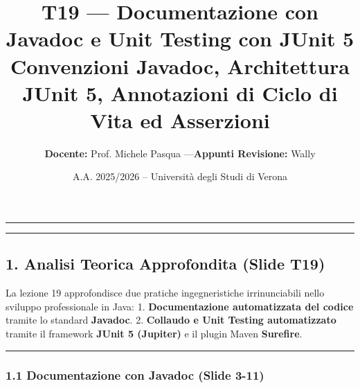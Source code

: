 \documentclass[11pt,a4paper]{article}
\title{\Huge\bfseries\sffamily\color{brandblue} T19 --- Documentazione con Javadoc e Unit Testing con JUnit 5 \\[0.3em] \large\sffamily Convenzioni Javadoc, Architettura JUnit 5, Annotazioni di Ciclo di Vita ed Asserzioni}
\author{\textbf{Docente:} Prof. Michele Pasqua \quad---\quad \textbf{Appunti Revisione:} Wally}
\date{A.A. 2025/2026 -- Universit\`a degli Studi di Verona}
\begin{document}
\maketitle
\thispagestyle{fancy}
\vspace{-1.2em}
\noindent\textcolor{brandblue}{\rule{\textwidth}{0.8pt}}
\vspace{1.2em}

\begin{center}\rule{0.5\linewidth}{0.5pt}\end{center}

\subsection{1. Analisi Teorica Approfondita (Slide
T19)}\label{analisi-teorica-approfondita-slide-t19}

La lezione 19 approfondisce due pratiche ingegneristiche irrinunciabili
nello sviluppo professionale in Java: 1. \textbf{Documentazione
automatizzata del codice} tramite lo standard \textbf{Javadoc}. 2.
\textbf{Collaudo e Unit Testing automatizzato} tramite il framework
\textbf{JUnit 5 (Jupiter)} e il plugin Maven \textbf{Surefire}.

\begin{center}\rule{0.5\linewidth}{0.5pt}\end{center}

\subsubsection{1.1 Documentazione con Javadoc (Slide
3-11)}\label{documentazione-con-javadoc-slide-3-11}
\end{document}
